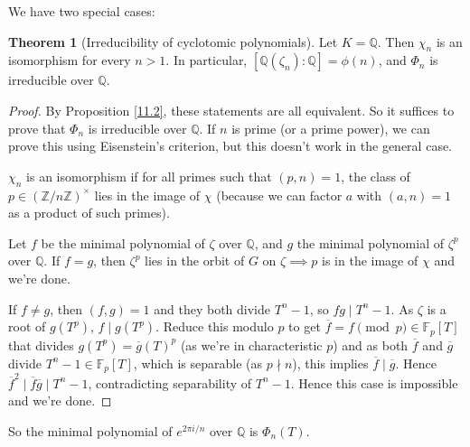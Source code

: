 \documentclass{article}
\theoremstyle{definition}
\newtheorem{theorem}{Theorem}[section]
\begin{document}
We have two special cases:
\begin{theorem}[Irreducibility of cyclotomic polynomials]
    Let $K=\mathbb{Q}$. Then $\chi_n$ is an isomorphism for every $n>1$. In particular, $[\mathbb{Q}(\zeta_n):\mathbb{Q}]=\phi(n)$, and $\Phi_n$ is irreducible over $\mathbb{Q}$.
\end{theorem}
\begin{proof}
    By Proposition \ref{11.2}, these statements are all equivalent. So it suffices to prove that $\Phi_n$ is irreducible over $\mathbb{Q}$. If $n$ is prime (or a prime power), we can prove this using Eisenstein's criterion, but this doesn't work in the general case.

    $\chi_n$ is an isomorphism if for all primes such that $(p,n)=1$, the class of $p \in (\mathbb{Z}/n\mathbb{Z})^\times$ lies in the image of $\chi$ (because we can factor $a$ with $(a,n)=1$ as a product of such primes).

    Let $f$ be the minimal polynomial of $\zeta$ over $\mathbb{Q}$, and $g$ the minimal polynomial of $\zeta^p$ over $\mathbb{Q}$. If $f=g$, then $\zeta^p$ lies in the orbit of $G$ on $\zeta \implies p$ is in the image of $\chi$ and we're done.

    If $f\neq g$, then $(f,g)=1$ and they both divide $T^n-1$, so $fg \mid T^n-1$. As $\zeta$ is a root of $g(T^p)$, $f \mid g(T^p)$. Reduce this modulo $p$ to get $\overline{f} = f \pmod{p} \in \mathbb{F}_p[T]$ that divides $g(T^p) = \overline{g}(T)^p$ (as we're in characteristic $p$) and as both $\overline{f}$ and $\overline{g}$ divide $T^n-1 \in \mathbb{F}_p[T]$, which is separable (as $p \nmid n$), this implies $\overline{f} \mid \overline{g}$. Hence $\overline{f}^2 \mid \overline{f}\overline{g} \mid T^n-1$, contradicting separability of $T^n-1$. Hence this case is impossible and we're done.
\end{proof}
So the minimal polynomial of $e^{2\pi i/n}$ over $\mathbb{Q}$ is $\Phi_n(T)$.
\vspace{1mm}

\end{document}
